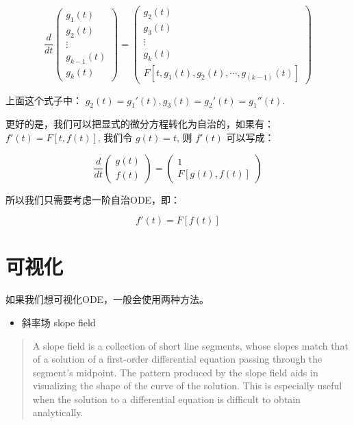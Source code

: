\documentclass[
]{book}
\providecommand{\tightlist}{%
  \setlength{\itemsep}{0pt}\setlength{\parskip}{0pt}}
\begin{document}
\[
\frac{d}{d t}\begin{pmatrix} g_1(t) \\ g_2(t) \\ \vdots \\ g_{k-1}(t) \\ g_k(t) \end{pmatrix} = \begin{pmatrix} g_2(t) \\ g_3(t)\\  \vdots \\ g_k(t) \\ F[t, g_1(t), g_2(t),  \cdots, g_{(k-1)}(t)]  \end{pmatrix} 
\]

上面这个式子中： \(g_2(t) = g_1'(t), g_3(t) = g_2'(t) = g_1''(t)\).

更好的是，我们可以把显式的微分方程转化为自治的，如果有： \(f'(t) = F[t, f(t)]\), 我们令 \(g(t) = t\), 则 \(f'(t)\) 可以写成：

\[
\frac{d}{d t}\begin{pmatrix} g(t) \\ f(t) \end{pmatrix} = \begin{pmatrix} 1 \\ F[g(t), f(t)] \end{pmatrix} 
\]

所以我们只需要考虑一阶自治ODE，即：

\[
f'(t) = F[f(t)]
\]

\hypertarget{ux53efux89c6ux5316}{%
\section{可视化}\label{ux53efux89c6ux5316}}

如果我们想可视化ODE，一般会使用两种方法。

\begin{itemize}
\tightlist
\item
  斜率场 slope field
\end{itemize}

\begin{quote}
A slope field is a collection of short line segments, whose slopes match that of a solution of a first-order differential equation passing through the segment's midpoint. The pattern produced by the slope field aids in visualizing the shape of the curve of the solution. This is especially useful when the solution to a differential equation is difficult to obtain analytically.
\end{quote}
\end{document}
